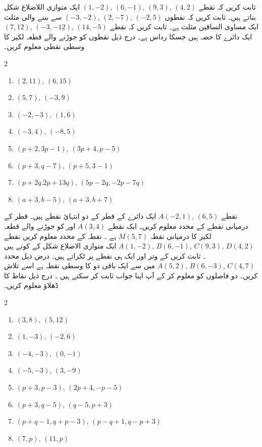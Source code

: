 ثابت کریں کہ نقطے \( (1,-2), \, (6,-1), \, (9,3), \, (4,2) \) ایک متوازی اللاضلاع شکل بناتے ہیں۔
ثابت کریں کہ نقطوں \( (-3,-2), \, (2,-7), \, (-2,5) \) سے بننے والی مثلث ایک مساوی الساقین مثلث ہے۔
ثابت کریں کہ نقطے \( (7,12), \, (-3,-12), \, (14,-5)\)  ایک دائرے کا حصہ ہیں جسکا رداس   ہے۔
درج ذیل نقطوں کو جوڑنے والے قطعہ لکیر کا وسطی نقطی معلوم کریں۔
\begin{multicols}{2}
\begin{enumerate}[.a]
\item \( (2,11), \, (6,15) \)
\item \( (5,7), \, (-3,9) \)
\item \( (-2,-3), \, (1,6) \)
\item \( (-3,4) , \, (-8,5) \)
\item \( (p+2, 3p-1), \, (3p+4,p-5) \)
\item \( (p+3,q-7), \, (p+5,3-1) \)
\item \( (p+2q.2p+13q), \, (5p-2q,-2p-7q) \)
\item \( (a+3,b-5), \, (a+3,b+7) \)
\end{enumerate}
\end{multicols}
نقطے \( A(-2,1) , \, (6,5) \) ایک دائرے کے قطر کے دو انتہائ نقطے ہیں۔ قطر کے درمیانی نقطے کے محدد معلوم کریں۔ 
ایک نقطے \(A(3,4)\) اور  کو جوڑنے والے قطعہ لکیر کا درمیانی نقطہ  \(M(5,7)\)       ہے ۔ نقطہ      کے محدد معلوم کریں
نقطے \( A(1,-2), \, B(6,-1), \, C(9,3), \, D(4,2) \) ایک متوازی الاضلاع شکل کے کونے ہیں ۔ ثابت کریں کے وتر اور     ایک ہی نقطے پر ٹکراتے ہیں۔
درض ذیل محدد \( A(5,2), \, B(6,-3), \, C(4,7) \) میں سے ایک باقی دو کا وسطی نقطہ ہے اسے تلاش کریں۔ دو فاصلوں کو معلوم کر کے آپ اپنا جواب ثابت کر سکتے ہیں ۔
%
درج ذیل نقاط کا ڈھلاؤ معلوم کریں۔
\begin{multicols}{2}
\begin{enumerate}[.a]
\item \( (3,8), \, (5,12) \)
\item \( (1,-3), \, (-2,6) \)
\item \( (-4,-3), \, (0,-1) \)
\item \( (-5,-3), \, (3,-9) \)
\item \( (p+3, p-3), \, (2p+4,-p-5) \)
\item \( (p+3,q-5), \, (q-5, p+3) \)
\item \( (p+q-1, q+p-3), \, (p-q+1, q-p+3) \)
\item \( (7,p), \, ( 11,p) \)
\end{enumerate}
\end{multicols}
